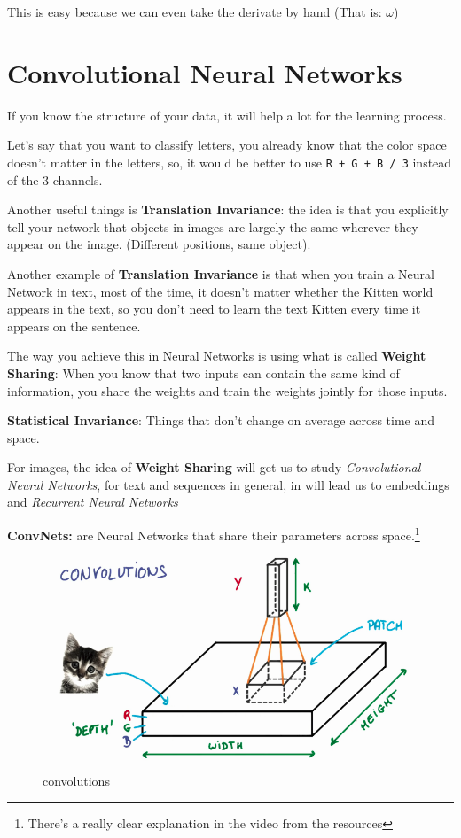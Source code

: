 \documentclass[11pt, a4paper]{article}
\begin{document}
This is easy because we can even take the derivate by hand (That is: $\omega$)


\section{Convolutional Neural Networks}%
\label{sec:convolutional_neural_networks}

If you know the structure of your data, it will help a lot for the learning process.

Let's say that you want to classify letters, you already know that the color space doesn't matter in the letters, so, it would be better to use \texttt{R + G + B / 3} instead of the 3 channels. 


Another useful things is \textbf{Translation Invariance}: the idea is that you explicitly tell your network that objects in images are largely the same wherever they appear on the image. (Different positions, same object).

 Another example of \textbf{Translation Invariance} is that when you train a Neural Network in text, most of the time, it doesn't matter whether the Kitten world appears in the text, so you don't need to learn the text Kitten every time it appears on the sentence. 

 The way you achieve this in Neural Networks is using what is called \textbf{Weight Sharing}: When you know that two inputs can contain the same kind of information, you share the weights and train the weights jointly for those inputs. 

 \textbf{Statistical Invariance}: Things that don't change on average across time and space.
 
 For images, the idea of \textbf{Weight Sharing} will get us to study \textit{Convolutional Neural Networks}, for text and sequences in general, in will lead us to embeddings and \textit{Recurrent Neural Networks}


 \textbf{ConvNets:} are Neural Networks that share their parameters across space.\footnote{There's a really clear explanation in the video from the resources}


 \begin{figure}[htb!]
 	\centering
 	\includegraphics[width=0.8\linewidth]{convolutions}
 	\caption{convolutions}
 	\label{fig:convolutions}
 \end{figure}
\end{document}
